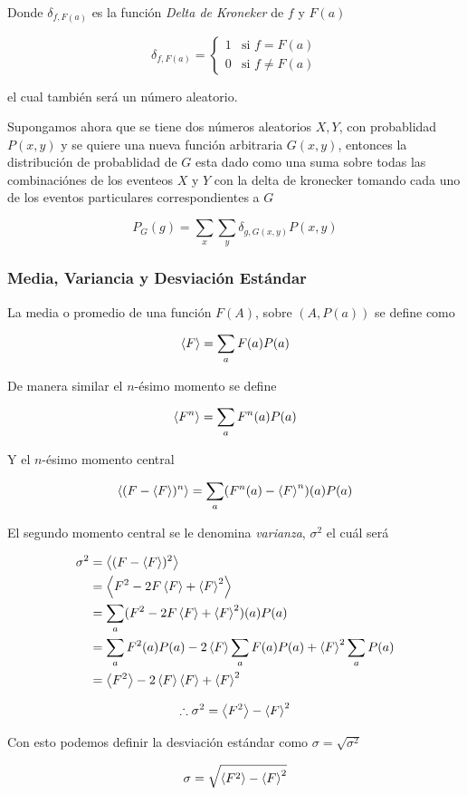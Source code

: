 Donde $\delta_{f,F(a)}$ es la función \textit{Delta de Kroneker} de $f$ y $F(a)$

\begin{equation}
  \delta_{f,F(a)} =
  \begin{cases}
    1 & \text{si } f = F(a)\\
    0 & \text{si } f \neq F(a)
  \end{cases}
  \label{eq:delta-kron}
\end{equation}

el cual también será un número aleatorio.

Supongamos ahora que se tiene dos números aleatorios $X, Y$, con probablidad
$P(x, y)$ y se quiere una nueva función arbitraria $G(x, y)$, entonces
la distribución de probablidad de $G$ esta dado como una suma sobre
todas las combinaciónes de los eventeos $X$ y $Y$ con la delta de kronecker
tomando cada uno de los eventos particulares correspondientes a $G$

\begin{equation}
  P_G(g) = \sum_{x}\sum_y\delta_{g, G(x, y)} P(x, y)
  \label{eq:prob-g}
\end{equation}

\subsubsection{Media, Variancia y Desviación Estándar}

La media o promedio de una función $F(A)$, sobre $(A, P(a))$ se define
como

\begin{equation}
  \left\langle F \right\rangle = \sum_a F(a) P(a)
  \label{eq:d-mean}
\end{equation}

De manera similar el $n$-ésimo momento se define

\begin{equation}
  \left\langle F^n \right\rangle = \sum_a F^n(a) P(a)
  \label{eq:d-n-moment}
\end{equation}

Y el $n$-ésimo momento central

\begin{equation}
  \left\langle (F - \left\langle F \right\rangle)^n \right\rangle
  = \sum_a (F^n(a) - \left\langle F \right\rangle^n)(a) P(a)
  \label{eq:d-central-moment}
\end{equation}

El segundo momento central se le denomina \textit{varianza}, $\sigma^2$ el cuál
será

\begin{align*}
  \sigma^2 &= \left\langle (F - \left\langle F \right\rangle)^2 \right\rangle\\
  &= \left\langle F^2 - 2F\left\langle F \right\rangle + \left\langle F \right\rangle^2 \right\rangle\\
  &= \sum_a (F^2 - 2F\left\langle F \right\rangle + \left\langle F \right\rangle^2)(a) P(a)\\
  &= \sum_a F^2(a)P(a) - 2\left\langle F \right\rangle\sum_a F(a)P(a) + \left\langle F \right\rangle^2\sum_aP(a)\\
  &= \left\langle F^2 \right\rangle - 2\left\langle F \right\rangle\left\langle F \right\rangle + \left\langle F \right\rangle^2
\end{align*}

\begin{equation}
  \therefore \sigma^2 = \left\langle F^2 \right\rangle - \left\langle F \right\rangle^2
  \label{eq:d-var}
\end{equation}

Con esto podemos definir la desviación estándar como $\sigma = \sqrt{\sigma^2}$

\begin{equation}
  \sigma = \sqrt{\left\langle F^2 \right\rangle - \left\langle F \right\rangle^2}
  \label{eq:d-std}
\end{equation}
